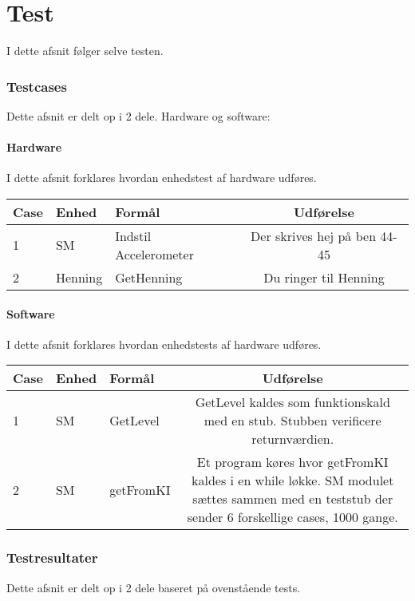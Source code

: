 \chapter{Test}
I dette afsnit følger selve testen.
\subsection{Testcases}
Dette afsnit er delt op i  2 dele. Hardware og software:\\
\subsubsection{Hardware}
I dette afsnit forklares hvordan enhedstest af hardware udføres.
\begin{table}[htbp]
\centering
\begin{tabular}{| l  | p{5cm} | p{5cm} | c |}
\hline
Case &Enhed &Formål &Udførelse\\\hline
1 &SM &Indstil Accelerometer &Der skrives hej på ben 44-45\\\hline
2 &Henning &GetHenning &Du ringer til Henning\\\hline
\end{tabular}
\end{table}
\subsubsection{Software}
I dette afsnit forklares hvordan enhedstests af hardware udføres.
\begin{table}[htbp]
\centering
\begin{tabular}{| l  | p{5cm} | p{5cm} | c |}
\hline
Case &Enhed &Formål &Udførelse\\\hline
1 &SM &GetLevel &GetLevel kaldes som funktionskald med en stub. Stubben verificere returnværdien.\\\hline
2 &SM &getFromKI &Et program køres hvor getFromKI kaldes i en while løkke. SM modulet sættes sammen med en teststub der sender 6 forskellige cases, 1000 gange.\\\hline
\end{tabular}
\end{table}
\subsection{Testresultater}
Dette afsnit er delt op i  2 dele baseret på ovenstående tests.\\
